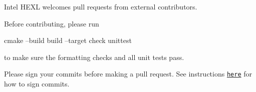 Intel H\+E\+XL welcomes pull requests from external contributors.

Before contributing, please run 
\begin{DoxyCode}
cmake --build build --target check unittest
\end{DoxyCode}
 to make sure the formatting checks and all unit tests pass.

Please sign your commits before making a pull request. See instructions \href{https://docs.github.com/en/github/authenticating-to-github/managing-commit-signature-verification/signing-commits}{\tt here} for how to sign commits. 